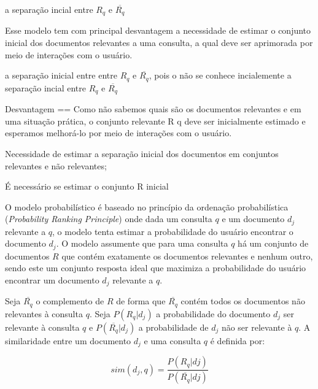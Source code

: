 




a separação incial entre $R_q$ e $\overline{R_q}$


Esse modelo tem com principal desvantagem a necessidade de estimar o conjunto inicial dos documentos relevantes a uma consulta, a qual deve ser aprimorada por meio de interações com o usuário.

a separação inicial entre entre $R_q$ e $\overline{R_q}$, pois o não se conhece incialemente a separação incial entre $R_q$ e $\overline{R_q}$ 



Desvantagem == 
Como não sabemos quais são os documentos relevantes e em uma situação prática, o conjunto relevante R q deve ser inicialmente estimado e esperamos melhorá-lo por meio de interações com o usuário.

Necessidade de estimar a separação inicial dos documentos em conjuntos relevantes e não relevantes;


É necessário se estimar o conjunto R inicial





O modelo probabilístico é baseado no princípio da ordenação probabilística (\textit{Probability Ranking Principle}) onde dada um consulta $q$ e um documento $d_j$ relevante a $q$, o modelo tenta estimar a probabilidade do usuário encontrar o documento $d_j$. O modelo assumente que para uma consulta $q$ há um conjunto de documentos $R$ que contém exatamente os documentos relevantes e nenhum outro, sendo este um conjunto resposta ideal que maximiza a probabilidade do usuário encontrar um documento $d_j$ relevante a $q$. 

Seja $\overline{R_q}$ o complemento de $R$ de forma que $\overline{R_q}$ contém todos os documentos não relevantes à consulta $q$. Seja $P(R_q|d_j)$ a probabilidade do documento $d_j$ ser relevante à consulta $q$ e $P(\overline{R_q}|d_j)$ a probabilidade de $d_j$ não ser relevante à $q$. A similaridade entre um documento $d_j$ e uma consulta $q$ é definida por:


\begin{equation}
	sim(d_j, q) = \frac{P(R_q|dj)}{P(\overline{R_q}|dj)}
	\label{equ:simprob}
\end{equation}




